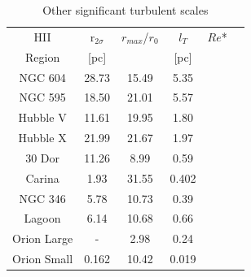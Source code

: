 \documentclass[fleqn,usenatbib, useAMS, a4paper]{mnras}
\begin{document}






\begin{table}
\begin{center}\caption{Other significant turbulent scales}
\begin{tabular}{cccccc}\hline
HII         &r$_{2\sigma}$ &\(r_{max}\)/\(r_0\)  &\(l_T\) & \(Re\)* \\
Region      &[pc]          &                     &[pc]    &   \\ \hline
NGC 604     &28.73         &15.49                &5.35    &   \\
NGC 595     &18.50         &21.01                &5.57    &   \\
Hubble V    &11.61         &19.95                &1.80    &   \\ 
Hubble X    &21.99         &21.67                &1.97    &   \\   
30 Dor      &11.26         &8.99                 &0.59    &   \\
Carina      &1.93          &31.55                &0.402   &   \\
NGC 346     &5.78          &10.73                &0.39    &   \\
Lagoon      &6.14          &10.68                &0.66    &   \\ 
Orion Large &-             &2.98                 &0.24    &   \\
Orion Small &0.162         &10.42                &0.019   &   \\ \hline	  
\end{tabular}\label{tab:ResII}
\end{center}
\end{table}  
\end{document}
